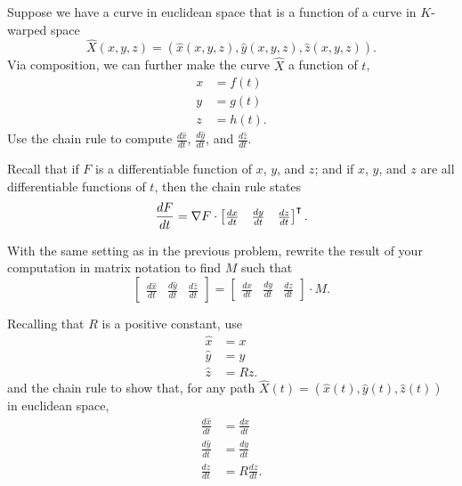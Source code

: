 \documentclass{ximera}
\begin{document}
\begin{problem}
  Suppose we have a curve in euclidean space that is a function of a
  curve in $K$-warped space
\[
\hat{X}(x,y,z)=\left(\hat{x}(x,y,z),\hat{y}(x,y,z),\hat{z}(x,y,z)  \right).
\]
Via composition, we can further make the curve $\hat{X}$ a function of $t$,
\begin{align*}
x &= f(t) \\
y &= g(t) \\
z &= h(t)  .
\end{align*}
Use the chain rule to compute $\frac{d\hat{x}}{dt}$,
$\frac{d\hat{y}}{dt}$, and $\frac{d\hat{z}}{dt}$.
\begin{hint}
  Recall that if $F$ is a differentiable function of $x$, $y$, and
  $z$; and if $x$, $y$, and $z$ are all differentiable functions of
  $t$, then the chain rule states
  \[
  \dd[F]{t} = \nabla F \cdot
  \begin{bmatrix}
    \dd[x]{t} & \dd[y]{t} & \dd[z]{t}
  \end{bmatrix}^\transpose.
  \]
\end{hint}
\end{problem}

\begin{problem}
  With the same setting as in the previous problem, rewrite the result
  of your computation in matrix notation to find $M$ such that
\[
\begin{bmatrix}
\frac{d\hat{x}}{dt} & \frac{d\hat{y}}{dt} & \frac{d\hat{z}}{dt}%
\end{bmatrix}
=
\begin{bmatrix}
\frac{dx}{dt} & \frac{dy}{dt} & \frac{dz}{dt}%
\end{bmatrix}\cdot M.
\]
\end{problem}

\begin{problem}
  \label{8} Recalling that $R$ is a positive constant, use
\begin{align*}
\hat{x}  &=x\\
\hat{y}  &=y\\
\hat{z}  &=Rz.
\end{align*}
and the chain rule to show that, for any path
$\hat{X}(t)=(\hat{x}(t),\hat{y}(t),\hat{z}(t))$ in euclidean space,%
\begin{align*}
\frac{d\hat{x}}{dt}  &  =\frac{dx}{dt}\\
\frac{d\hat{y}}{dt}  &  =\frac{dy}{dt}\\
\frac{d\hat{z}}{dt}  &  =R\frac{dz}{dt}.
\end{align*}
\end{problem}
\end{document}
